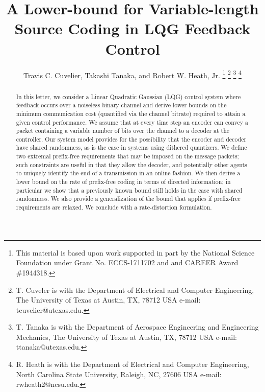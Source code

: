 \documentclass[letterpaper, 10 pt, conference]{ieeeconf}  %
\title{\LARGE \bf
A Lower-bound for Variable-length Source Coding in LQG Feedback Control
}
\author{Travis C. Cuvelier, Takashi Tanaka, and Robert W. Heath, Jr.
\thanks{This material is based upon work supported in part by the National Science Foundation under Grant No. ECCS-1711702 and and CAREER Award \#1944318. }
\thanks{T. Cuveler is with the Department
of Electrical and Computer Engineering, The University of Texas at Austin,
TX, 78712 USA e-mail: tcuvelier@utexas.edu.}%
\thanks{T. Tanaka is with the Department
of Aerospace Engineering and Engineering Mechanics, The University of Texas at Austin,
TX, 78712 USA e-mail: ttanaka@utexas.edu.}%
\thanks{R. Heath is with the Department
of Electrical and Computer Engineering, North Carolina State University, Raleigh, 
NC, 27606 USA e-mail: rwheath2@ncsu.edu.}}
\newcounter{constraint}[section]
\begin{document}
\maketitle

\begin{abstract}
In this letter, we consider a Linear Quadratic Gaussian (LQG) control system where feedback occurs over a noiseless binary channel and derive lower bounds on the minimum communication cost (quantified via the channel bitrate) required to attain a given control performance. We assume that at every time step an encoder can convey a packet containing a variable number of bits over the channel to a decoder at the controller. Our system model provides for the possibility that the encoder and decoder have shared randomness, as is the case in systems using dithered quantizers. We define two extremal prefix-free requirements that may be imposed on the message packets; such constraints are useful in that they allow the decoder, and potentially other agents to uniquely identify the end of a transmission in an online fashion. We then derive a lower bound on the rate of prefix-free coding in terms of directed information; in particular we show that a previously known bound still holds in the case with shared randomness. We also provide a generalization of the bound that applies if prefix-free requirements are relaxed. We conclude with a rate-distortion formulation. 
\end{abstract}
\end{document}
